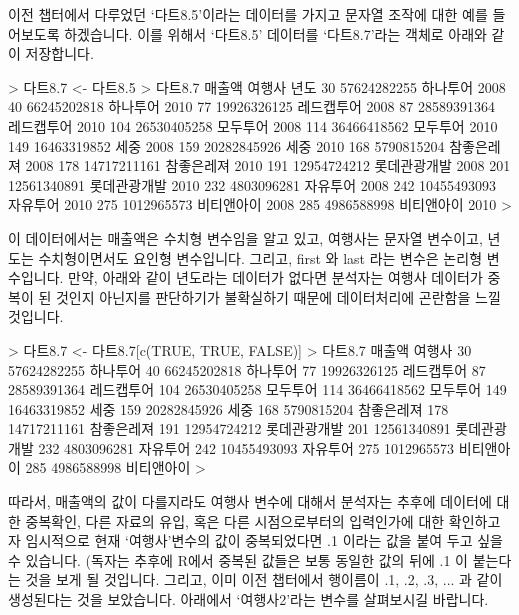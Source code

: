 \documentclass[tutorial.tex]{subfiles}
\begin{document}
이전 챕터에서 다루었던 `다트8.5'이라는 데이터를 가지고 문자열 조작에 대한 예를 들어보도록 하겠습니다.
이를 위해서 `다트8.5' 데이터를 `다트8.7'라는 객체로 아래와 같이 저장합니다.
 
\begin{Schunk}
% 다트8.7 <- 다트8.5
\begin{Soutput}
> 다트8.7 <- 다트8.5
> 다트8.7
         매출액       여행사 년도
30  57624282255     하나투어 2008
40  66245202818     하나투어 2010
77  19926326125   레드캡투어 2008
87  28589391364   레드캡투어 2010
104 26530405258     모두투어 2008
114 36466418562     모두투어 2010
149 16463319852         세중 2008
159 20282845926         세중 2010
168  5790815204   참좋은레져 2008
178 14717211161   참좋은레져 2010
191 12954724212 롯데관광개발 2008
201 12561340891 롯데관광개발 2010
232  4803096281     자유투어 2008
242 10455493093     자유투어 2010
275  1012965573   비티앤아이 2008
285  4986588998   비티앤아이 2010
> 
\end{Soutput}
\end{Schunk}

이 데이터에서는 매출액은 수치형 변수임을 알고 있고, 여행사는 문자열 변수이고, 년도는 수치형이면서도 요인형 변수입니다.
그리고, first 와 last 라는 변수은 논리형 변수입니다.
만약, 아래와 같이 년도라는 데이터가 없다면 분석자는 여행사 데이터가 중복이 된 것인지 아닌지를 판단하기가 불확실하기 때문에 데이터처리에 곤란함을 느낄 것입니다.
 
\begin{Schunk}
\begin{Soutput}
> 다트8.7 <- 다트8.7[c(TRUE, TRUE, FALSE)] 
> 다트8.7
         매출액       여행사
30  57624282255     하나투어
40  66245202818     하나투어
77  19926326125   레드캡투어
87  28589391364   레드캡투어
104 26530405258     모두투어
114 36466418562     모두투어
149 16463319852         세중
159 20282845926         세중
168  5790815204   참좋은레져
178 14717211161   참좋은레져
191 12954724212 롯데관광개발
201 12561340891 롯데관광개발
232  4803096281     자유투어
242 10455493093     자유투어
275  1012965573   비티앤아이
285  4986588998   비티앤아이
> 
\end{Soutput}
\end{Schunk}

따라서, 매출액의 값이 다를지라도 여행사 변수에 대해서 분석자는 추후에 데이터에 대한 중복확인, 다른 자료의 유입, 혹은 다른 시점으로부터의 입력인가에 대한 확인하고자 임시적으로 현재 `여행사'변수의 값이 중복되었다면 .1 이라는 값을 붙여 두고 싶을 수 있습니다.
(독자는 추후에 R에서 중복된 값들은 보통 동일한 값의 뒤에 .1 이 붙는다는 것을 보게 될 것입니다.  
그리고, 이미 이전 챕터에서 행이름이 .1, .2, .3, ... 과 같이 생성된다는 것을 보았습니다.
아래에서 `여행사2'라는 변수를 살펴보시길 바랍니다.
\end{document}
